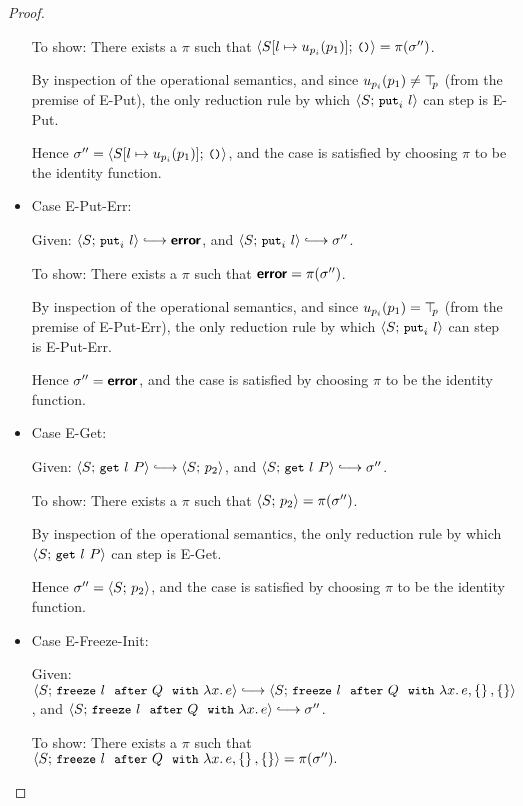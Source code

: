 \begin{proof}
\begin{itemize}
    To show: There exists a $\pi$ such that
    $\langle S[l \mapsto u_{p_i}(p_1)];\, \mbox{\small{\texttt{()}}} \rangle = \pi(\sigma'')$.

    By inspection of the operational semantics, and since
    $u_{p_i}(p_1) \neq \top\hspace{-0.85mm}_{p}$ (from the premise of {\sc E-Put}), the
    only reduction rule by which $\langle S;\, \mbox{\small{\texttt{put}}}_i~l \rangle$ can step is
    {\sc E-Put}.

    Hence $\sigma'' = \langle S[l \mapsto u_{p_i}(p_1)];\, \mbox{\small{\texttt{()}}} \rangle$,
    and the case is satisfied by choosing $\pi$ to be the identity
    function.

  \item Case {\sc E-Put-Err}:

    Given: $\config{S}{\putiexp{l}} \parstepsto \error$, and
    $\config{S}{\putiexp{l}} \parstepsto \conf''$.

    To show: There exists a $\pi$ such that $\textbf{\textsf{error}} = \pi(\sigma'')$.

    By inspection of the operational semantics, and since
    $u_{p_i}(p_1) = \top\hspace{-0.85mm}_{p}$ (from the premise of {\sc E-Put-Err}), the
    only reduction rule by which $\langle S;\, \mbox{\small{\texttt{put}}}_i~l \rangle$ can step is
    {\sc E-Put-Err}.

    Hence $\sigma'' = \textbf{\textsf{error}}$, and the case is satisfied by choosing
    $\pi$ to be the identity function.

  \item Case {\sc E-Get}:

    Given: $\config{S}{\getexp{l}{P}} \parstepsto \config{S}{p_2}$,
    and $\config{S}{\getexp{l}{P}} \parstepsto \conf''$.

    To show: There exists a $\pi$ such that $\langle S;\, p_2 \rangle =
    \pi(\sigma'')$.

    By inspection of the operational semantics, the only reduction
    rule by which $\langle S;\, \mbox{\small{\texttt{get}}}~l~P \rangle$ can step is {\sc E-Get}.

    Hence $\sigma'' = \langle S;\, p_2 \rangle$, and the case is satisfied by
    choosing $\pi$ to be the identity function.

  \item Case {\sc E-Freeze-Init}:

    Given: $\config{S}{\freezeafter{l}{Q}{\lam{x}{e}}} \parstepsto
    \config{S}{\freezeafterfull{l}{Q}{\lam{x}{e}}{\setof{}}{\setof{}}}$,
    and $\config{S}{\freezeafter{l}{Q}{\lam{x}{e}}} \parstepsto \conf''$.

    To show: There exists a $\pi$ such that
    $\langle S;\, \mbox{\small{\texttt{freeze}}}~l~~{\mbox{\small{\texttt{after}}}}~Q~~{\mbox{\small{\texttt{with}}}}~\lambda x.\,e, \left\{\right\}, \left\{\right\} \rangle
    = \pi(\sigma'').$


\end{itemize}
\end{proof}
